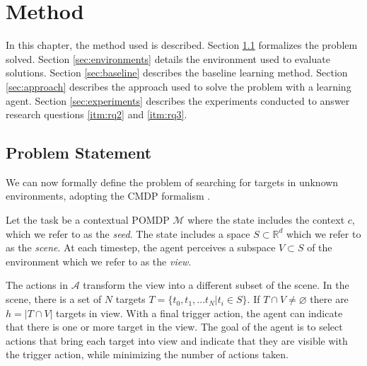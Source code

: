 \chapter{Method}
\label{cha:method}


% 

In this chapter, the method used is described.
Section \ref{sec:problem} formalizes the problem solved.
Section \ref{sec:environments} details the environment used to evaluate solutions.
Section \ref{sec:baseline} describes the baseline learning method.
Section \ref{sec:approach} describes the approach used to solve the problem with a learning agent.
Section \ref{sec:experiments} describes the experiments conducted to answer research questions \ref{itm:rq2} and \ref{itm:rq3}.

\section{Problem Statement}
\label{sec:problem}


We can now formally define the problem of searching for targets in unknown environments,
adopting the CMDP formalism \cite{kirk_survey_2022}.

Let the task be a contextual POMDP \(\mathcal{M}\) where the state includes the context \(c\), which we refer to as the \textit{seed}.
The state includes a space \(S \subset \mathbb{R}^d\) which we refer to as the \textit{scene}.
At each timestep, the agent perceives a subspace \(V \subset S\) of the environment which we refer to as the \textit{view}.

The actions in \(\mathcal{A}\) transform the view into a different subset of the scene.
In the scene, there is a set of \(N\) targets \(T = \{t_0, t_1, \dots t_N | t_i \in S\}\).
If \(T \cap V \neq \varnothing\) there are \(h = \left\lvert T \cap V \right\rvert\) targets in view.
With a final trigger action, the agent can indicate that there is one or more target in the view.
The goal of the agent is to select actions that bring each target into view and indicate that they are visible with the trigger action, while minimizing the number of actions taken.

